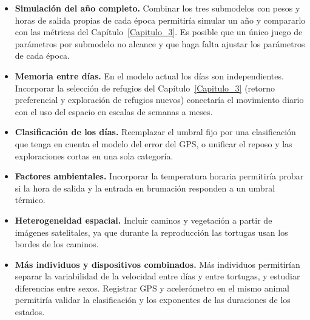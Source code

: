 \begin{itemize}
    \item \textbf{Simulación del año completo.} Combinar los tres submodelos con pesos y horas de salida propias de cada época permitiría simular un año
    y compararlo con las métricas del Capítulo~\ref{Capitulo_3}. Es posible que un único juego de parámetros por submodelo no alcance y que haga falta
    ajustar los parámetros de cada época.
    \item \textbf{Memoria entre días.} En el modelo actual los días son independientes. Incorporar la selección de refugios del Capítulo~\ref{Capitulo_3}
    (retorno preferencial y exploración de refugios nuevos) conectaría el movimiento diario con el uso del espacio en escalas de semanas a meses.
    \item \textbf{Clasificación de los días.} Reemplazar el umbral fijo por una clasificación que tenga en cuenta el modelo del error del GPS, o unificar
    el reposo y las exploraciones cortas en una sola categoría.
    \item \textbf{Factores ambientales.} Incorporar la temperatura horaria permitiría probar si la hora de salida y la entrada en brumación responden a
    un umbral térmico.
    \item \textbf{Heterogeneidad espacial.} Incluir caminos y vegetación a partir de imágenes satelitales, ya que durante la reproducción las tortugas
    usan los bordes de los caminos.
    \item \textbf{Más individuos y dispositivos combinados.} Más individuos permitirían separar la variabilidad de la velocidad entre días y entre
    tortugas, y estudiar diferencias entre sexos. Registrar GPS y acelerómetro en el mismo animal permitiría validar la clasificación y los exponentes
    de las duraciones de los estados.
\end{itemize}

